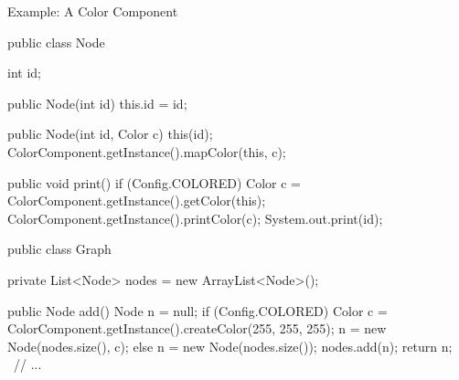 \begin{frame}[fragile]{Example: A Color Component}
	\begin{mycolumns}[columns=2,widths={50,50}]
{\tiny
\begin{codetight}{}
public class Node {
	int id;

	public Node(int id) {
		this.id = id;
	}

	public Node(int id, Color c) {
		this(id);
		ColorComponent.getInstance().mapColor(this, c);
	}

	public void print() {
		if (Config.COLORED) {
			Color c = ColorComponent.getInstance().getColor(this);
			ColorComponent.getInstance().printColor(c);
		}
		System.out.print(id);
	}
}
\end{codetight}
\begin{codetight}{}
public class Graph {
	private List<Node> nodes = new ArrayList<Node>();

	public Node add() {
		Node n = null;
		if (Config.COLORED) {
			Color c = ColorComponent.getInstance().createColor(255, 255, 255);
			n = new Node(nodes.size(), c);
		} else {
			n = new Node(nodes.size());
		}
		nodes.add(n);
		return n;
	}
	~// ...~
}
\end{codetight}
}
		\mynextcolumn
	\end{mycolumns}
\end{frame}


